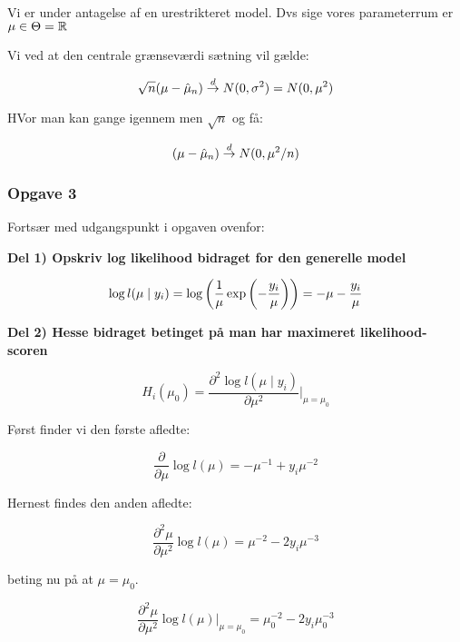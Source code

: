Vi er under antagelse af en urestrikteret model. Dvs sige vores parameterrum er $\mu \in \Theta =  \mathbb{R}$

Vi ved at den centrale grænseværdi sætning vil gælde:

\begin{equation}
    \sqrt{n} (\mu - \hat{\mu}_n) \overset{d}{\rightarrow} N(0, \sigma^2) = N(0, \mu^2)
\end{equation}

HVor man kan gange igennem men $\sqrt{n}$ og få:

\begin{equation}
    (\mu - \hat{\mu}_n) \overset{d}{\rightarrow} N(0, \mu^2 /n)
\end{equation}

\subsubsection{Opgave 3}

Fortsær med udgangspunkt i opgaven ovenfor:

\textbf{Del 1) Opskriv log likelihood bidraget for den generelle model}

\begin{equation}
    \log l(\mu \mid y_i) =\log \left( \frac{1}{\mu} \exp  \left( - \frac{y_i}{\mu}\right) \right) = - \mu - \frac{y_i}{\mu}
\end{equation}

\textbf{Del 2) Hesse bidraget betinget på man har maximeret likelihood-scoren}


\begin{equation}
    H_i (\mu_0) = \frac{\partial^2 \log l(\mu \mid y_i)}{\partial \mu^2} \bigg\vert_{\mu = \mu_0}
\end{equation}

Først finder vi den første afledte:

\begin{equation}
    \frac{\partial}{\partial \mu} \log l (\mu)  = -\mu^{-1} + y_i \mu^{-2}
\end{equation}

Hernest findes den anden afledte:

\begin{equation}
    \frac{\partial^2 \mu}{\partial \mu^2} \log l(\mu) = \mu^{-2} - 2 y_i \mu^{-3}
\end{equation}

beting nu på at $\mu = \mu_0$.

\begin{equation}
     \frac{\partial^2 \mu}{\partial \mu^2} \log l(\mu) \bigg \vert_{\mu =\mu_0} = \mu_0^{-2} - 2 y_i \mu_0^{-3}
\end{equation}


